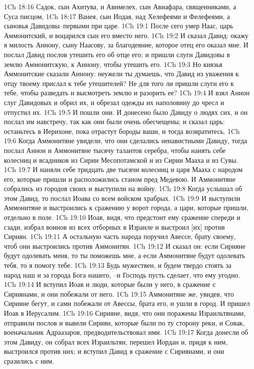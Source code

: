 1Ch 18:16  Садок, сын Ахитува, и Авимелех, сын Авиафара, священниками, а Суса писцом,
1Ch 18:17  Ванея, сын Иодая, над Хелефеями и Фелефеями, а сыновья Давидовы--первыми при царе.
1Ch 19:1  После сего умер Наас, царь Аммонитский, и воцарился сын его вместо него.
1Ch 19:2  И сказал Давид: окажу я милость Аннону, сыну Наасову, за благодеяние, которое отец его оказал мне. И послал Давид послов утешить его об отце его; и пришли слуги Давидовы в землю Аммонитскую, к Аннону, чтобы утешить его.
1Ch 19:3  Но князья Аммонитские сказали Аннону: неужели ты думаешь, что Давид из уважения к отцу твоему прислал к тебе утешителей? Не для того ли пришли слуги его к тебе, чтобы разведать и высмотреть землю и разорить ее?
1Ch 19:4  И взял Аннон слуг Давидовых и обрил их, и обрезал одежды их наполовину до чресл и отпустил их.
1Ch 19:5  И пошли они. И донесено было Давиду о людях сих, и он послал им навстречу, так как они были очень обесчещены; и сказал царь: останьтесь в Иерихоне, пока отрастут бороды ваши, и тогда возвратитесь.
1Ch 19:6  Когда Аммонитяне увидели, что они сделались ненавистными Давиду, тогда послал Аннон и Аммонитяне тысячу талантов серебра, чтобы нанять себе колесниц и всадников из Сирии Месопотамской и из Сирии Мааха и из Сувы.
1Ch 19:7  И наняли себе тридцать две тысячи колесниц и царя Мааха с народом его, которые пришли и расположились станом пред Медевою. И Аммонитяне собрались из городов своих и выступили на войну.
1Ch 19:8  Когда услышал об этом Давид, то послал Иоава со всем войском храбрых.
1Ch 19:9  И выступили Аммонитяне и выстроились к сражению у ворот города, а цари, которые пришли, отдельно в поле.
1Ch 19:10  Иоав, видя, что предстоит ему сражение спереди и сзади, избрал воинов из всех отборных в Израиле и выстроил [их] против Сириян.
1Ch 19:11  А остальную часть народа поручил Авессе, брату своему, чтоб они выстроились против Аммонитян.
1Ch 19:12  И сказал он: если Сирияне будут одолевать меня, то ты поможешь мне, а если Аммонитяне будут одолевать тебя, то я помогу тебе.
1Ch 19:13  Будь мужествен, и будем твердо стоять за народ наш и за города Бога нашего, --и Господь пусть сделает, что ему угодно.
1Ch 19:14  И вступил Иоав и люди, которые были у него, в сражение с Сириянами, и они побежали от него.
1Ch 19:15  Аммонитяне же, увидев, что Сирияне бегут, и сами побежали от Авессы, брата его, и ушли в город. И пришел Иоав в Иерусалим.
1Ch 19:16  Сирияне, видя, что они поражены Израильтянами, отправили послов и вывели Сириян, которые были по ту сторону реки, и Совак, военачальник Адраазаров, предводительствовал ими.
1Ch 19:17  Когда донесли об этом Давиду, он собрал всех Израильтян, перешел Иордан и, придя к ним, выстроился против них; и вступил Давид в сражение с Сириянами, и они сразились с ним.
